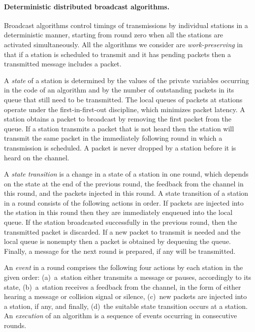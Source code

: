 \documentclass[11pt]{article}
\newcommand{\BBB}{\vspace*{-\bigskipamount}}
\newcommand{\Paragraph}[1]{\BBB\paragraph{#1}}
\begin{document}

\Paragraph{Deterministic distributed broadcast algorithms.}




Broadcast algorithms control timings of transmissions by individual stations in a deterministic manner, starting from round zero when all the stations are activated simultaneously.
All the algorithms we consider are \emph{work-preserving} in that if a station is scheduled to transmit and it has pending packets then a transmitted message includes a packet.

A \emph{state} of a station is determined by the values of the private variables occurring in the code of an algorithm and by the number of outstanding packets in its queue that still need to be transmitted.
The local queues of packets at stations operate under the first-in-first-out discipline, which minimizes packet latency.
A  station obtains a packet to broadcast by removing the first packet from the queue.
If a station transmits a packet that is not heard then the station will transmit the same packet in the immediately following round in which a transmission is scheduled. 
A packet is never dropped by a station before it is heard on the channel.

A \emph{state transition} is a change in a state of a station in one round, which depends on the state at the end of the previous round, the feedback from the channel in this round, and the packets injected in this round.
A state transition of a station in a round  consists of the following  actions in order.
If packets are injected into the station in this round then they are immediately enqueued into the local queue.
If the station broadcasted successfully in the previous round, then the transmitted packet is discarded.
If a new packet to transmit is needed and the local queue is nonempty then a packet is obtained by dequeuing the queue.
Finally, a message for the next round is prepared, if any will be  transmitted.

An \emph{event} in a round comprises the following four actions by each  station in the given order: 
(a)~a~station either transmits a message or pauses, accordingly to its state, 
(b)~a~station receives a feedback from the channel, in the form of either hearing a message or collision signal or silence,  
(c)~new packets are injected into a station, if any, and finally,
(d)~the suitable state transition occurs at a station.
An \emph{execution} of an algorithm is a sequence of events occurring in consecutive rounds.
\end{document}
